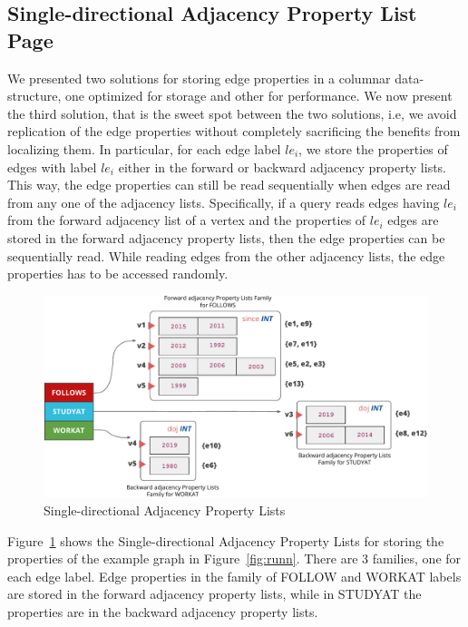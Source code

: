 \subsection{Single-directional Adjacency Property List Page}

We presented two solutions for storing edge properties in a columnar data-structure, one optimized for storage and other for performance. We now present the third solution, that is the sweet spot between the two solutions, i.e, we avoid replication of the edge properties without completely sacrificing the benefits from localizing them. In particular, for each edge label $le_i$, we store the properties of edges with label $le_i$ either in the forward or backward adjacency property lists. This way, the edge properties can still be read sequentially when edges are read from any one of the adjacency lists.  Specifically, if a query reads edges having $le_i$ from the forward adjacency list of a vertex and the properties of $le_i$ edges are stored in the forward adjacency property lists, then the edge properties can be sequentially read. While reading edges from the other adjacency lists, the edge properties has to be accessed randomly.

\begin{figure}
	\vspace{-25pt}
	\hfill\includegraphics[scale=0.78]{img/single-dir-prop-list}\hspace*{\fill}
	\captionsetup{justification=centering}
	\caption{Single-directional Adjacency Property Lists}
	\label{fig:single-dir-prop-list}
	\vspace{0pt}
\end{figure}

Figure~\ref{fig:single-dir-prop-list} shows the Single-directional Adjacency Property Lists for storing the properties of the example graph in Figure~\ref{fig:runn}. There are 3 families, one for each edge label. Edge properties in the family of FOLLOW and WORKAT labels are stored in the forward adjacency property lists, while in STUDYAT the properties are in the backward adjacency property lists.

